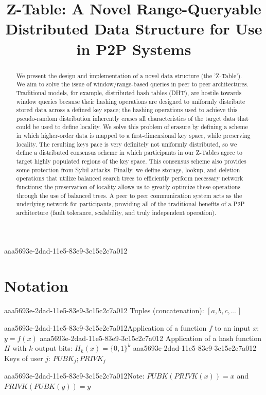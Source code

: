 \documentclass[12pt]{article}
\title{Z-Table: A Novel Range-Queryable Distributed Data Structure for Use in P2P Systems}
\begin{document}
\maketitle

\begin{abstract}
We present the design and implementation of a novel data structure (the 'Z-Table'). We aim to solve the issue of window/range-based queries in peer to peer architectures. Traditional models, for example,  distributed hash tables (DHT), are hostile towards window queries because their hashing operations are designed to uniformly distribute stored data across a defined key space; the hashing operations used to achieve this pseudo-random distribution inherently erases all characteristics of the target data that could be used to define locality. We solve this problem of erasure by defining a scheme in which higher-order data is mapped to a first-dimensional key space, while preserving locality. The resulting keys pace is very definitely not uniformly distributed, so we define a distributed consensus scheme in which participants in our Z-Tables agree to target highly populated regions of the key space. This consensus scheme also provides some protection from Sybil attacks. Finally, we define storage, lookup, and deletion operations that utilize balanced search trees to efficiently perform necessary network functions; the preservation of locality allows us to greatly optimize these operations through the use of balanced trees. A peer to peer communication system acts as the underlying network for participants, providing all of the traditional benefits of a P2P architecture (fault tolerance, scalability, and truly independent operation).
\end{abstract}

aaa5693e-2dad-11e5-83e9-3c15c2c7a012\section{Notation}
aaa5693e-2dad-11e5-83e9-3c15c2c7a012
Tuples (concatenation): $[a,b,c,...]$

aaa5693e-2dad-11e5-83e9-3c15c2c7a012Application of a function $f$ to an input $x$: $y=f(x)$
aaa5693e-2dad-11e5-83e9-3c15c2c7a012
Application of a hash function $H$ with $k$ output bits: $H_{k}(x) = \{0,1\}^k$
aaa5693e-2dad-11e5-83e9-3c15c2c7a012
Keys of user $j$: $ PUBK_j; PRIVK_j $

aaa5693e-2dad-11e5-83e9-3c15c2c7a012Note: $PUBK(PRIVK(x)) = x$ and $PRIVK(PUBK(y)) = y$~
\end{document}
